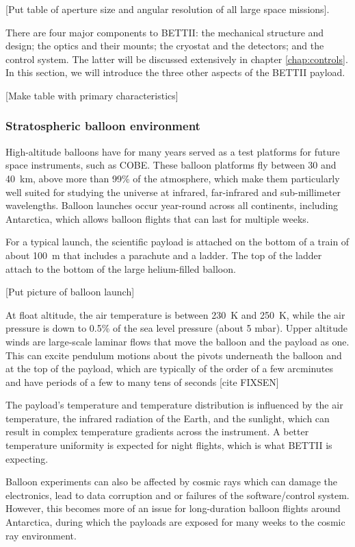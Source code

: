 [Put table of aperture size and angular resolution of all large space missions].

There are four major components to BETTII: the mechanical structure and design; the optics and their mounts; the cryostat and the detectors; and the control system. The latter will be discussed extensively in chapter \ref{chap:controls}. In this section, we will introduce the three other aspects of the BETTII payload.

[Make table with primary characteristics]

\subsubsection{Stratospheric balloon environment}

High-altitude balloons have for many years served as a test platforms for future space instruments, such as COBE. These balloon platforms fly between 30 and \SI{40}{\kilo\meter}, above more than 99\% of the atmosphere, which make them particularly well suited for studying the universe at infrared, far-infrared and sub-millimeter wavelengths. Balloon launches occur year-round across all continents, including Antarctica, which allows balloon flights that can last for multiple weeks. 

For a typical launch, the scientific payload is attached on the bottom of a train of about \SI{100}{\meter} that includes a parachute and a ladder. The top of the ladder attach to the bottom of the large helium-filled balloon. 

[Put picture of balloon launch]

At float altitude, the air temperature is between \SI{230}{\kelvin} and \SI{250}{\kelvin}, while the air pressure is down to 0.5\% of the sea level pressure (about 5 mbar). Upper altitude winds are large-scale laminar flows that move the balloon and the payload as one. This can excite pendulum motions about the pivots underneath the balloon and at the top of the payload, which are typically of the order of a few arcminutes and have periods of a few to many tens of seconds [cite FIXSEN]

The payload's temperature and temperature distribution is influenced by the air temperature, the infrared radiation of the Earth, and the sunlight, which can result in complex temperature gradients across the instrument. A better temperature uniformity is expected for night flights, which is what BETTII is expecting.

Balloon experiments can also be affected by cosmic rays which can damage the electronics, lead to data corruption and or failures of the software/control system. However, this becomes more of an issue for long-duration balloon flights around Antarctica, during which the payloads are exposed for many weeks to the cosmic ray environment.

